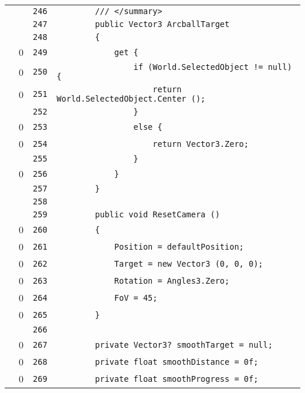 \documentclass[a4paper,10pt]{article}
\begin{document}
\begin{longtable}[l]{lrrl}
\cellcolor{gray} &  & \verb~246~ & \verb~        /// </summary>~\\
\cellcolor{gray} &  & \verb~247~ & \verb~        public Vector3 ArcballTarget~\\
\cellcolor{gray} &  & \verb~248~ & \verb~        {~\\
\cellcolor{red} & 0 & \verb~249~ & \verb~            get {~\\
\cellcolor{red} & 0 & \verb~250~ & \verb~                if (World.SelectedObject != null) {~\\
\cellcolor{red} & 0 & \verb~251~ & \verb~                    return World.SelectedObject.Center ();~\\
\cellcolor{gray} &  & \verb~252~ & \verb~                }~\\
\cellcolor{red} & 0 & \verb~253~ & \verb~                else {~\\
\cellcolor{red} & 0 & \verb~254~ & \verb~                    return Vector3.Zero;~\\
\cellcolor{gray} &  & \verb~255~ & \verb~                }~\\
\cellcolor{red} & 0 & \verb~256~ & \verb~            }~\\
\cellcolor{gray} &  & \verb~257~ & \verb~        }~\\
\cellcolor{gray} &  & \verb~258~ & \verb~~\\
\cellcolor{gray} &  & \verb~259~ & \verb~        public void ResetCamera ()~\\
\cellcolor{red} & 0 & \verb~260~ & \verb~        {~\\
\cellcolor{red} & 0 & \verb~261~ & \verb~            Position = defaultPosition;~\\
\cellcolor{red} & 0 & \verb~262~ & \verb~            Target = new Vector3 (0, 0, 0);~\\
\cellcolor{red} & 0 & \verb~263~ & \verb~            Rotation = Angles3.Zero;~\\
\cellcolor{red} & 0 & \verb~264~ & \verb~            FoV = 45;~\\
\cellcolor{red} & 0 & \verb~265~ & \verb~        }~\\
\cellcolor{gray} &  & \verb~266~ & \verb~~\\
\cellcolor{red} & 0 & \verb~267~ & \verb~        private Vector3? smoothTarget = null;~\\
\cellcolor{red} & 0 & \verb~268~ & \verb~        private float smoothDistance = 0f;~\\
\cellcolor{red} & 0 & \verb~269~ & \verb~        private float smoothProgress = 0f;~\\

\end{longtable}
\end{document}
